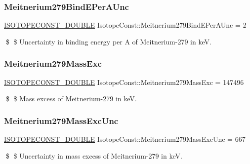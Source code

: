 \subsubsection{\texorpdfstring{Meitnerium279\+Bind\+E\+Per\+A\+Unc}{Meitnerium279BindEPerAUnc}}
{\footnotesize\ttfamily \mbox{\hyperlink{group___isotope_const-_macros_ga8f45a7272ce02c0b4c65c44636ed719a}{I\+S\+O\+T\+O\+P\+E\+C\+O\+N\+S\+T\+\_\+\+D\+O\+U\+B\+LE}} Isotope\+Const\+::\+Meitnerium279\+Bind\+E\+Per\+A\+Unc = 2}

\$ \$ Uncertainty in binding energy per A of Meitnerium-\/279 in keV. \mbox{\label{group___isotope_const-_meitnerium-_mt279_gad9e3ced4def3e3fdef51e2fa3b12910b}} 
\subsubsection{\texorpdfstring{Meitnerium279\+Mass\+Exc}{Meitnerium279MassExc}}
{\footnotesize\ttfamily \mbox{\hyperlink{group___isotope_const-_macros_ga8f45a7272ce02c0b4c65c44636ed719a}{I\+S\+O\+T\+O\+P\+E\+C\+O\+N\+S\+T\+\_\+\+D\+O\+U\+B\+LE}} Isotope\+Const\+::\+Meitnerium279\+Mass\+Exc = 147496}

\$ \$ Mass excess of Meitnerium-\/279 in keV. \mbox{\label{group___isotope_const-_meitnerium-_mt279_gacba907dbc8989ecf78e2a9edf468e4d5}} 
\subsubsection{\texorpdfstring{Meitnerium279\+Mass\+Exc\+Unc}{Meitnerium279MassExcUnc}}
{\footnotesize\ttfamily \mbox{\hyperlink{group___isotope_const-_macros_ga8f45a7272ce02c0b4c65c44636ed719a}{I\+S\+O\+T\+O\+P\+E\+C\+O\+N\+S\+T\+\_\+\+D\+O\+U\+B\+LE}} Isotope\+Const\+::\+Meitnerium279\+Mass\+Exc\+Unc = 667}

\$ \$ Uncertainty in mass excess of Meitnerium-\/279 in keV. \mbox{\label{group___isotope_const-_meitnerium-_mt279_gaf32f9d5dd2af64a6e7028f366d0938d4}} 
